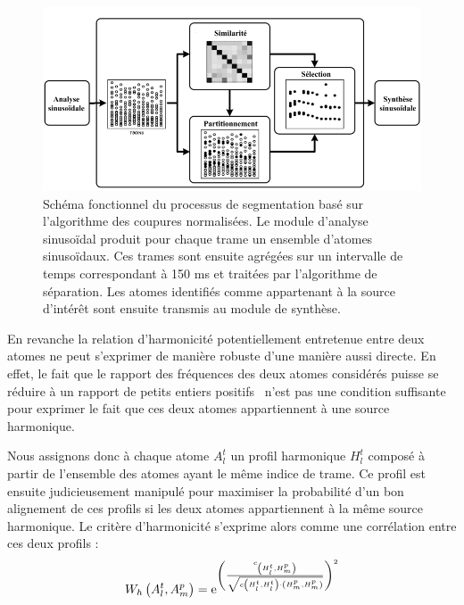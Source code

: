 \begin{figure}[t]
  \includegraphics[width=1\textwidth]{figures/ncutDiagramFr.png}
  \caption{Schéma fonctionnel du processus de segmentation basé sur l'algorithme des coupures normalisées. Le module d'analyse sinusoïdal produit pour chaque trame un ensemble d'atomes sinusoïdaux. Ces trames sont ensuite agrégées sur un intervalle de temps correspondant à 150 ms et traitées par l'algorithme de séparation. Les atomes identifiés comme appartenant à la source d'intérêt sont ensuite transmis au module de synthèse.}  \label{fig:ncut}
\end{figure}

En revanche la relation d'harmonicité potentiellement entretenue entre deux atomes ne peut s'exprimer de manière robuste d'une manière aussi directe. En effet, le fait que le rapport des fréquences des deux atomes considérés puisse se réduire à un rapport de petits entiers positifs~\cite{virtanen2000separation} n'est pas une condition suffisante pour exprimer le fait que ces deux atomes appartiennent à une source harmonique.

Nous assignons donc à chaque atome $A _ { l } ^ {t}$ un profil harmonique $H _ { l } ^ {t}$ composé à partir de l'ensemble des atomes ayant le même indice de trame. Ce profil est ensuite judicieusement manipulé pour maximiser la probabilité d'un bon alignement de ces profils si les deux atomes appartiennent à la même source harmonique\cite{lagrangeTaslp08}. Le critère d'harmonicité s'exprime alors comme une corrélation entre ces deux profils :
\begin{equation}
  W _ { h } \left( A _ { l } ^ {t} , A _ { m } ^ { p } \right) = \operatorname{e}^{\left( \frac { c _ { \left( H _ { l } ^ {t} , H _ { m } ^ { p } \right) } } { \sqrt { c \left( H _ { l } ^ {t} , H _ { l } ^ {t} \right) \cdot \left( H _ { m } ^ { p } , H _ { m } ^ { p } \right) } } \right) ^ { 2 } }
\end{equation}

